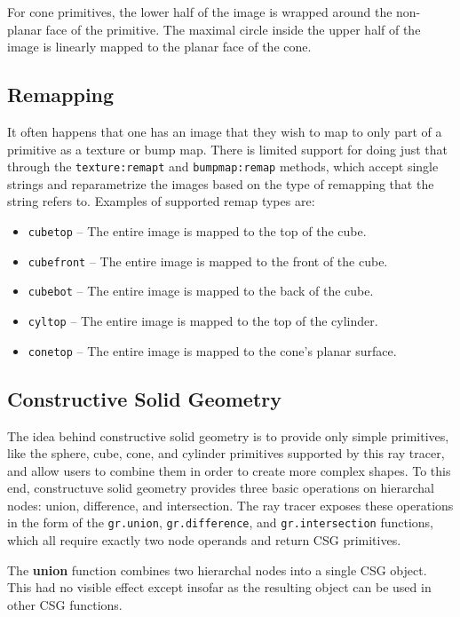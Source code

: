 \documentclass{article}
\begin{document}
For cone primitives, the lower half of the image is wrapped around the
non-planar face of the primitive. The maximal circle inside the upper half of
the image is linearly mapped to the planar face of the cone.

\subsection{Remapping}
\label{remapping}

It often happens that one has an image that they wish to map to only part of a
primitive as a texture or bump map. There is limited support for doing just that
through the {\tt texture:remapt} and {\tt bumpmap:remap} methods, which accept
single strings and reparametrize the images based on the type of remapping that
the string refers to. Examples of supported remap types are:

\newcommand{\cmditem}[1]{\item {\tt #1}}

\begin{itemize}
  \cmditem{cubetop} -- The entire image is mapped to the top of the cube.
  \cmditem{cubefront} -- The entire image is mapped to the front of the cube.
  \cmditem{cubebot} -- The entire image is mapped to the back of the cube.
  \cmditem{cyltop} -- The entire image is mapped to the top of the cylinder.
  \cmditem{conetop} -- The entire image is mapped to the cone's planar surface.
\end{itemize}

\subsection{Constructive Solid Geometry}
\label{csg}

The idea behind constructive solid geometry is to provide only simple
primitives, like the sphere, cube, cone, and cylinder primitives supported by
this ray tracer, and allow users to combine them in order to create more complex
shapes. To this end, constructuve solid geometry provides three basic operations
on hierarchal nodes: union, difference, and intersection. The ray tracer exposes
these operations in the form of the {\tt gr.union}, {\tt gr.difference}, and
{\tt gr.intersection} functions, which all require exactly two node operands and
return CSG primitives.

The {\bf union} function combines two hierarchal nodes into a single CSG object. This
had no visible effect except insofar as the resulting object can be used in
other CSG functions.
\end{document}
